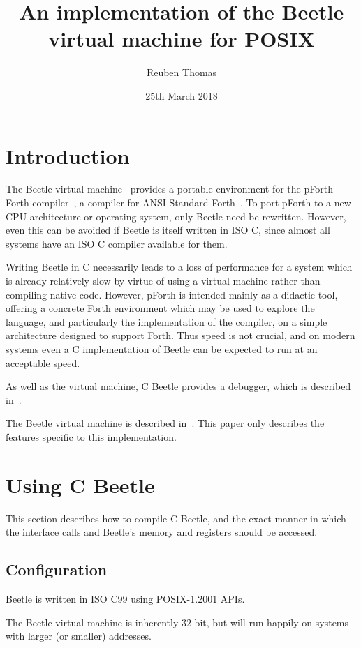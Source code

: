 \documentclass[english]{article}
\title{An implementation of the Beetle virtual machine for POSIX}
\author{Reuben Thomas}
\date{25th March 2018}
\begin{document}
\maketitle


\section{Introduction}

The Beetle virtual machine~\cite{beetle} provides a portable environment
for the pForth Forth compiler~\cite{beetledis}, a compiler for ANSI Standard
Forth~\cite{ANSIforth}. To port pForth to a new CPU architecture or operating system, only Beetle need be rewritten. However, even this can be
avoided if Beetle is itself written in ISO C, since almost all systems have
an ISO C compiler available for them.

Writing Beetle in C necessarily leads to a loss of performance for a system
which is already relatively slow by virtue of using a virtual machine
rather than compiling native code. However, pForth is intended mainly as a
didactic tool, offering a concrete Forth environment which may be used to
explore the language, and particularly the implementation of the compiler, on
a simple architecture designed to support Forth. Thus speed is not crucial,
and on modern systems even a C implementation of Beetle can be expected to
run at an acceptable speed.

As well as the virtual machine, C Beetle provides a debugger, which is described in~\cite{beetleuiface}.

The Beetle virtual machine is described in~\cite{beetle}. This paper only
describes the features specific to this implementation.


\section{Using C Beetle}

This section describes how to compile C Beetle, and the exact manner in which
the interface calls and Beetle's memory and registers should be accessed.


\subsection{Configuration}
\label{configuration}

Beetle is written in ISO C99 using POSIX-1.2001 APIs.

The Beetle virtual machine is inherently 32-bit, but will run happily on systems with larger (or smaller) addresses.
\end{document}
